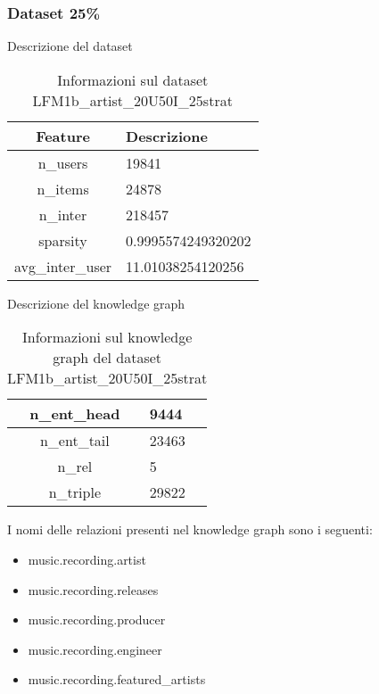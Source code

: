 \subsubsection{Dataset 25\%}

Descrizione del dataset
\begin{table}[H]
    \centering
    \footnotesize
    \begin{tabularx}{\textwidth}{|c|X|}
        \hline
        \textbf{Feature} & \textbf{Descrizione} \\
        \hline
        n\_users & 19841 \\
        \hline
        n\_items & 24878 \\
        \hline
        n\_inter & 218457 \\
        \hline
        sparsity & 0.9995574249320202 \\
        \hline
        avg\_inter\_user & 11.01038254120256 \\
        \hline
    \end{tabularx}
    \caption{Informazioni sul dataset LFM1b\_artist\_20U50I\_25strat}
    \label{tab:dataset_info}
\end{table}


\noindent Descrizione del knowledge graph
\begin{table}[H]
    \centering
    \footnotesize
    \begin{tabularx}{\textwidth}{|c|X|}
        \hline
        n\_ent\_head & 9444 \\
        \hline
        n\_ent\_tail & 23463 \\
        \hline
        n\_rel & 5 \\
        \hline
        n\_triple & 29822 \\
        \hline
    \end{tabularx}
    \caption{Informazioni sul knowledge graph del dataset LFM1b\_artist\_20U50I\_25strat}
    \label{tab:dataset_info}
\end{table}

\noindent I nomi delle relazioni presenti nel knowledge graph sono i seguenti:
\begin{itemize}
    \item music.recording.artist
    \item music.recording.releases
    \item music.recording.producer
    \item music.recording.engineer
    \item music.recording.featured\_artists
\end{itemize}